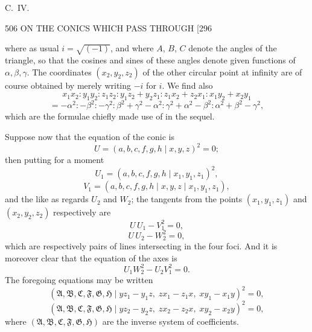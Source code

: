 \documentclass[11pt]{article}
\begin{document}
\vfill
\begin{flushright}\small C.\ IV.\end{flushright}

\newpage
\begin{center}
506 \hfill ON THE CONICS WHICH PASS THROUGH \hfill [296
\end{center}

where as usual $i=\sqrt{(-1)}$, and where $A$, $B$, $C$ denote the angles of the triangle, so that the cosines and sines of these angles denote given functions of $\alpha,\beta,\gamma$. The coordinates $(x_{2},y_{2},z_{2})$ of the other circular point at infinity are of course obtained by merely writing $-i$ for $i$. We find also
\[ x_{1}x_{2} : y_{1}y_{2} : z_{1}z_{2} : y_{1}z_{2}+y_{2}z_{1} : z_{1}x_{2}+z_{2}x_{1} : x_{1}y_{2}+x_{2}y_{1} \]
\[ = -\alpha^{2} : -\beta^{2} : -\gamma^{2} : \beta^{2}+\gamma^{2}-\alpha^{2} : \gamma^{2}+\alpha^{2}-\beta^{2} : \alpha^{2}+\beta^{2}-\gamma^{2}, \]
which are the formulae chiefly made use of in the sequel.

Suppose now that the equation of the conic is
\[ U=(a,b,c,f,g,h \mid x,y,z)^{2}=0; \]
then putting for a moment
\[ U_{1}=(a,b,c,f,g,h \mid x_{1},y_{1},z_{1})^{2}, \]
\[ V_{1}=(a,b,c,f,g,h \mid x,y,z\mid x_{1},y_{1},z_{1}), \]
and the like as regards $U_{2}$ and $W_{2}$; the tangents from the points $(x_{1},y_{1},z_{1})$ and $(x_{2},y_{2},z_{2})$ respectively are
\[ U\,U_{1}-V_{1}^{2}=0, \]
\[ U\,U_{2}-W_{2}^{2}=0, \]
which are respectively pairs of lines intersecting in the four foci. And it is moreover clear that the equation of the axes is
\[ U_{1}W_{2}^{2}-U_{2}V_{1}^{2}=0. \]
The foregoing equations may be written
\[ (\mathfrak{A},\mathfrak{B},\mathfrak{C},\mathfrak{F},\mathfrak{G},\mathfrak{H} \mid yz_{1}-y_{1}z,\; zx_{1}-z_{1}x,\; xy_{1}-x_{1}y)^{2}=0, \]
\[ (\mathfrak{A},\mathfrak{B},\mathfrak{C},\mathfrak{F},\mathfrak{G},\mathfrak{H} \mid yz_{2}-y_{2}z,\; zx_{2}-z_{2}x,\; xy_{2}-x_{2}y)^{2}=0, \]
where $(\mathfrak{A},\mathfrak{B},\mathfrak{C},\mathfrak{F},\mathfrak{G},\mathfrak{H})$ are the inverse system of coefficients.
\end{document}
